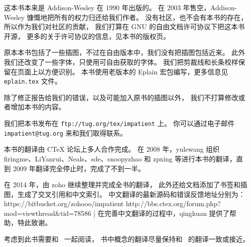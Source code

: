 %


\baselineskip

 这本书本来是 Addison-Wesley 在 1990 年出版的。
在 2003 年售空，Addison-Wesley 慷慨地把所有的权力归还给我们作者。
没有社区，也不会有本书的存在，所以作为我们对社区的贡献，
我们打算在 GNU 的自由文档许可协议下把这本书开源，
更多的关于许可协议的信息，见本书的版权页。

原本本书包括了一些插图，不过在自由版本中，我们没有把插图包括近来。
此外我们还改变了一些字体，只使用可自由获取的字体。
我们把剪裁线和长条校样保留在页面上以方便识别。
本书使用老版本的 Eplain 宏包编写，更多信息见 {\tt eplain.tex} 文件。

除了修正报告给我们的错误，以及可能加入原书的插图以外，
我们不打算修改或者增加本书的内容。

我们把本书发布在 {\tt ftp://tug.org/tex/impatient} 上。
你可以通过电子邮件 {\tt impatient@tug.org} 来和我们取得联系。

\baselineskip

本书的翻译由 CTeX 论坛上多人合作完成。
在 2008 年，yulewang 组织 firingme、LiYanrui、Neals、sde、snoopyzhao
和 zpxing 等进行本书的翻译，直到 2009 年翻译完全停止时，完成了不到一半。

在 2014 年，由 zoho 继续整理并完成全书的翻译，
此外还给文档添加了书签和插图，生成了交叉引用和中文索引。
中文翻译的最新源码和错误反馈地址分别为：
\csdisplay
https://bitbucket.org/zohooo/impatient
http://bbs.ctex.org/forum.php?mod=viewthread&tid=78586
|
在完善中文翻译的过程中，qingkuan 提供了帮助，特此致谢。

考虑到此书需要和 \texbook\ 一起阅读，
书中概念的翻译尽量保持和 \texbook\ 的翻译一致或接近。

\pagebreak
\byebye
